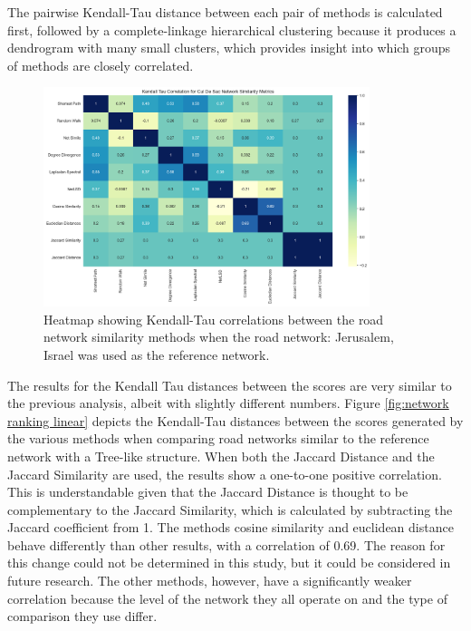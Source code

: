 The pairwise Kendall-Tau distance between each pair of methods is calculated first, followed by a complete-linkage hierarchical clustering because it produces a dendrogram with many small clusters, which provides insight into which groups of methods are closely correlated.

\begin{figure}[!ht]
\centering
\includegraphics[width=0.85\textwidth,center]{picture/Cul De Sac/culdesac2.png}
\caption[Heatmap showing Kendall-Tau correlations between the road network similarity methods for Cul De Sac Road Networks]{Heatmap showing Kendall-Tau correlations between the road network similarity methods when the road network: Jerusalem, Israel was used as the reference network.}
\label{fig:network ranking Cul De Sac}
\end{figure}

The results for the Kendall Tau distances between the scores are very similar to the previous analysis, albeit with slightly different numbers. Figure \ref{fig:network ranking linear} depicts the Kendall-Tau distances between the scores generated by the various methods when comparing road networks similar to the reference network with a Tree-like structure. When both the Jaccard Distance and the Jaccard Similarity are used, the results show a one-to-one positive correlation. This is understandable given that the Jaccard Distance is thought to be complementary to the Jaccard Similarity, which is calculated by subtracting the Jaccard coefficient from 1. The methods cosine similarity and euclidean distance behave differently than other results, with a correlation of 0.69. The reason for this change could not be determined in this study, but it could be considered in future research. The other methods, however, have a significantly weaker correlation because the level of the network they all operate on and the type of comparison they use differ.